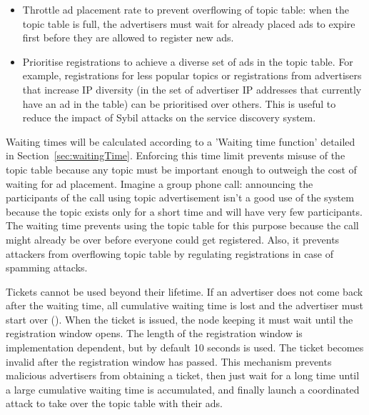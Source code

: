 \begin{itemize}
    \item Throttle ad placement rate to prevent overflowing of topic table: when the topic table is full, the advertisers must wait for already placed ads to expire first before they are allowed to register new ads.
    \item Prioritise registrations to achieve a diverse set of ads in the topic table. For example, registrations for less popular topics or registrations from advertisers that increase IP diversity (in the set of advertiser IP addresses that currently have an ad in the table) can be prioritised over others. This is useful to reduce the impact of Sybil attacks on the service discovery system.
\end{itemize}

Waiting times will be calculated according to a 'Waiting time function' detailed in Section~\ref{sec:waitingTime}.  Enforcing this time limit prevents misuse of the topic table because any topic must be important enough to outweigh the cost of waiting for ad placement. Imagine a group phone call: announcing the participants of the call using topic advertisement isn't a good use of the system because the topic exists only for a short time and will have very few participants. The waiting time prevents using the topic table for this purpose because the call might already be over before everyone could get registered. Also, it prevents attackers from overflowing topic table by regulating registrations in case of spamming attacks.

Tickets cannot be used beyond their lifetime. If an advertiser does not come back after the waiting time, all cumulative waiting time is lost and the advertiser must start over (). When the ticket is issued, the node keeping it must wait until the registration window opens. The length of the registration window is implementation dependent, but by default 10 seconds is used. The ticket becomes invalid after the registration window has passed. This mechanism prevents malicious advertisers from obtaining a ticket, then just wait for a long time until a large cumulative waiting time is accumulated, and finally launch a coordinated attack to take over the topic table with their ads.

